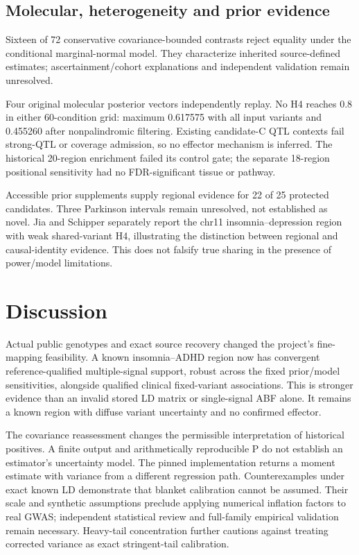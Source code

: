 \documentclass[11pt]{article}
\begin{document}
\subsection*{Molecular, heterogeneity and prior evidence}
Sixteen of 72 conservative covariance-bounded contrasts reject equality under the conditional marginal-normal model. They characterize inherited source-defined estimates; ascertainment/cohort explanations and independent validation remain unresolved.

Four original molecular posterior vectors independently replay. No H4 reaches 0.8 in either 60-condition grid: maximum 0.617575 with all input variants and 0.455260 after nonpalindromic filtering. Existing candidate-C QTL contexts fail strong-QTL or coverage admission, so no effector mechanism is inferred. The historical 20-region enrichment failed its control gate; the separate 18-region positional sensitivity had no FDR-significant tissue or pathway.

Accessible prior supplements supply regional evidence for 22 of 25 protected candidates. Three Parkinson intervals remain unresolved, not established as novel. Jia and Schipper separately report the chr11 insomnia--depression region with weak shared-variant H4, illustrating the distinction between regional and causal-identity evidence. This does not falsify true sharing in the presence of power/model limitations.

\section*{Discussion}
Actual public genotypes and exact source recovery changed the project's fine-mapping feasibility. A known insomnia--ADHD region now has convergent reference-qualified multiple-signal support, robust across the fixed prior/model sensitivities, alongside qualified clinical fixed-variant associations. This is stronger evidence than an invalid stored LD matrix or single-signal ABF alone. It remains a known region with diffuse variant uncertainty and no confirmed effector.

The covariance reassessment changes the permissible interpretation of historical positives. A finite output and arithmetically reproducible P do not establish an estimator's uncertainty model. The pinned implementation returns a moment estimate with variance from a different regression path. Counterexamples under exact known LD demonstrate that blanket calibration cannot be assumed. Their scale and synthetic assumptions preclude applying numerical inflation factors to real GWAS; independent statistical review and full-family empirical validation remain necessary. Heavy-tail concentration further cautions against treating corrected variance as exact stringent-tail calibration.
\end{document}
